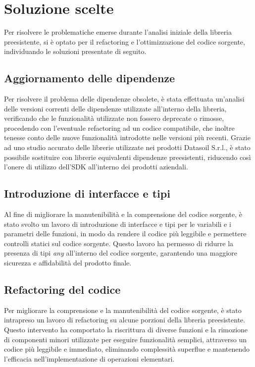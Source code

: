 \section{Soluzione scelte}
Per risolvere le problematiche emerse durante l'analisi iniziale della libreria preesistente, si è optato per il refactoring e l'ottimizzazione
del codice sorgente, individuando le soluzioni presentate di seguito.

\subsection{Aggiornamento delle dipendenze}
Per risolvere il problema delle dipendenze obsolete, è stata effettuata un'analisi delle versioni correnti delle dipendenze utilizzate all'interno della libreria,
verificando che le funzionalità utilizzate non fossero deprecate o rimosse, procedendo con l'eventuale refactoring ad un codice compatibile, che inoltre tenesse conto
delle nuove funzionalità introdotte nelle versioni più recenti. \newline
Grazie ad uno studio accurato delle librerie utilizzate nei prodotti Datasoil S.r.l., è stato possibile sostituire con librerie equivalenti dipendenze preesistenti,
riducendo così l'onere di utilizzo dell'SDK all'interno dei prodotti aziendali.

\subsection{Introduzione di interfacce e tipi}
Al fine di migliorare la manutenibilità e la comprensione del codice sorgente, è stato svolto un lavoro di introduzione di interfacce e tipi per le variabili e i parametri
delle funzioni, in modo da rendere il codice più leggibile e permettere controlli statici sul codice sorgente. \newline
Questo lavoro ha permesso di ridurre la presenza di tipi \textit{any} all'interno del codice sorgente, garantendo una maggiore sicurezza e affidabilità del prodotto finale.

\subsection{Refactoring del codice}
Per migliorare la comprensione e la manutenibilità del codice sorgente, è stato intrapreso un lavoro di refactoring su alcune porzioni della libreria preesistente.
Questo intervento ha comportato la riscrittura di diverse funzioni e la rimozione di componenti minori utilizzate per eseguire funzionalità semplici, attraverso un codice
più leggibile e immediato, eliminando complessità superflue e mantenendo l'efficacia nell'implementazione di operazioni elementari.


